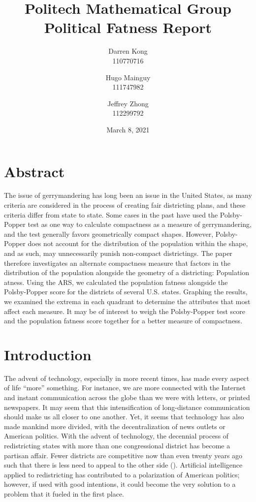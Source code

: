 \documentclass[letterpaper]{article}
\title{
	\textbf{Politech Mathematical Group} \\ 
	\vspace{2ex} 
	Political Fatness Report
	\vspace{2ex}
}
\author{
	Darren Kong \\ 110770716
	\and 
	Hugo Mainguy \\ 111747982
	\and 
	Jeffrey Zhong \\ 112299792
	\vspace{3ex}
}
\date{March 8, 2021}
\begin{document}
\begin{titlepage}
\maketitle
\thispagestyle{empty}
\end{titlepage}

\section{Abstract}
The issue of gerrymandering has long been an issue in the United States, as many criteria are considered in the process of creating fair districting plans, and these criteria differ from state to state. Some cases in the past have used the Polsby-Popper test as one way to calculate compactness as a measure of gerrymandering, and the test generally favors geometrically compact shapes. However, Polsby-Popper does not account for the distribution of the population within the shape, and as such, may unnecessarily punish non-compact districtings. The paper therefore investigates an alternate compactness measure that factors in the distribution of the population alongside the geometry of a districting: Population atness. Using the ARS, we calculated the population fatness alongside the Polsby-Popper score for the districts of several U.S. states. Graphing the results, we examined the extrema in each quadrant to determine the attributes that most affect each measure. It may be of interest to weigh the Polsby-Popper test score and the population fatness score together for a better measure of compactness. 


\section{Introduction}

The advent of technology, especially in more recent times, has made every aspect of life “more” something. For instance, we are more connected with the Internet and instant communication across the globe than we were with letters, or printed newspapers. It may seem that this intensification of long-distance communication should make us all closer to one another. Yet, it seems that technology has also made mankind more divided, with the decentralization of news outlets or American politics. With the advent of technology, the decennial process of redistricting states with more than one congressional district has become a partisan affair. Fewer districts are competitive now than even twenty years ago such that there is less need to appeal to the other side (\cite{cook}). Artificial intelligence applied to redistricting has contributed to a polarization of American politics; however, if used with good intentions, it could become the very solution to a problem that it fueled in the first place.
\end{document}
